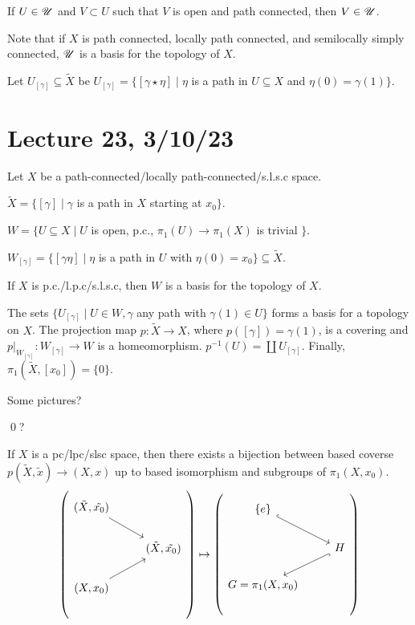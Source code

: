 \documentclass[x11names,reqno,14pt]{extarticle}
\begin{document}
If $U \in\mathscr{U}$ and $V \subset U$ such that $V$ is open and path connected, then $V \in \mathscr{U}$.		

Note that if $X$ is path connected, locally path connected, and semilocally simply connected, $\mathscr{U}$ is a basis for the topology of $X$. 


Let $U_{[\gamma]} \subseteq \tilde{X}$ be $U_{[\gamma]} = \{[\gamma\star\eta]\mid \eta$ is a path in $U\subseteq X$ and $\eta(0) = \gamma(1)\}$. 

\section*{Lecture 23, 3/10/23}

Let $X$ be a path-connected/locally path-connected/s.l.s.c space. 

$\tilde{X} = \{[\gamma]\mid \gamma$ is a path in $X$ starting at $x_0\}$. 

$W = \{U\subseteq X \mid U$ is open, p.c., $\pi_1(U)\to\pi_1(X)$ is trivial $\}$. 

$W_{[\gamma]} = \{[\gamma\eta] \mid \eta$ is a path in $U$ with $\eta(0) = x_0\} \subseteq \tilde{X}$.

\rem 

If $X$ is p.c./l.p.c/s.l.s.c, then $W$ is a basis for the topology of $X$. 

\claim

The sets $\{U_{[\gamma]} \mid U \in W, \gamma$ any path with $\gamma(1) \in U \}$ forms a basis for a topology on $X$. The projection map $p:\tilde{X}\to X$, where $p([\gamma]) = \gamma(1)$, is a covering and $p|_{W_{[\gamma]}}:W_{[\gamma]}\to W$ is a homeomorphism. $p^{-1}(U) = \coprod U_{[\gamma]}$. Finally, $\pi_1(\tilde{X}, [x_0]) = \{0\}$. 

\proof

Some pictures?

\qed ?

\thm If $X$ is a pc/lpc/slsc space, then there exists a bijection between based coverse $p(\tilde{X},\tilde{x})\to(X,x)$ up to based isomorphism and subgroups of $\pi_1(X, x_0)$. 
\[
\left(
\begin{tikzcd}
(\tilde{X},\tilde{x_0}) \ar[dr]& \\
& (\tilde{X}, \tilde{x_0}) \\
(X, x_0)\ar[ur] & \\
\end{tikzcd}
\right)
\mapsto
\left(
\begin{tikzcd}
\{e\}\ar[dr, hook] & \\
& H \ar[dl, hook]\\
G = \pi_1(X, x_0) & \\
\end{tikzcd}
\right)
\]
\end{document}
